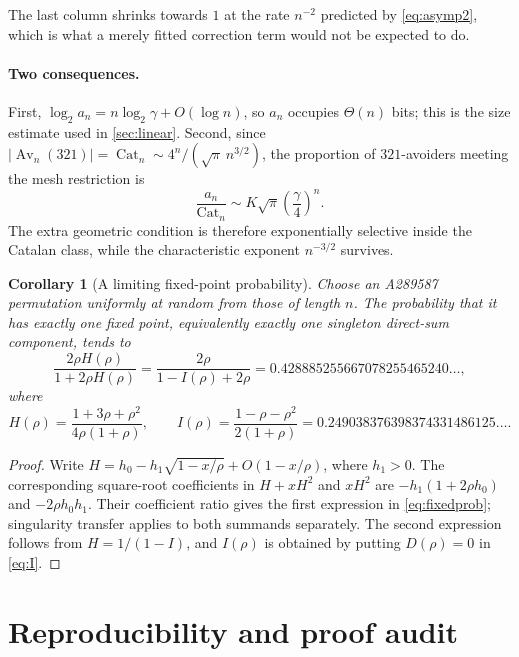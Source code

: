 \documentclass[11pt,letterpaper]{article}
\numberwithin{equation}{section}
\newtheorem{corollary}[theorem]{Corollary}
\theoremstyle{definition}
\DeclareMathOperator{\Av}{Av}
\newcommand{\Cat}{\operatorname{Cat}}
\begin{document}
The last column shrinks towards $1$ at the rate $n^{-2}$ predicted by
\eqref{eq:asymp2}, which is what a merely fitted correction term would
not be expected to do.

\paragraph{Two consequences.}
First, $\log_2a_n=n\log_2\gamma+O(\log n)$, so $a_n$ occupies $\Theta(n)$
bits; this is the size estimate used in \cref{sec:linear}. Second, since
$|\Av_n(321)|=\Cat_n\sim4^n/(\sqrt\pi\,n^{3/2})$, the proportion of
$321$-avoiders meeting the mesh restriction is
\begin{equation}
 \frac{a_n}{\Cat_n}\sim K\sqrt\pi\left(\frac\gamma4\right)^n.
 \label{eq:proportion}
\end{equation}
The extra geometric condition is therefore exponentially selective inside
the Catalan class, while the characteristic exponent $n^{-3/2}$ survives.

\begin{corollary}[A limiting fixed-point probability]
\label{cor:fixedprob}
Choose an A289587 permutation uniformly at random from those of length
$n$. The probability that it has exactly one fixed point, equivalently
exactly one singleton direct-sum component, tends to
\begin{equation}
 \frac{2\rho H(\rho)}{1+2\rho H(\rho)}
    =\frac{2\rho}{1-I(\rho)+2\rho}
    =0.428885255667078255465240\ldots,
 \label{eq:fixedprob}
\end{equation}
where
\begin{equation}
 H(\rho)=\frac{1+3\rho+\rho^2}{4\rho(1+\rho)},
 \qquad
 I(\rho)=\frac{1-\rho-\rho^2}{2(1+\rho)}
        =0.249038376398374331486125\ldots.
 \label{eq:Irho}
\end{equation}
\end{corollary}
\begin{proof}
Write $H=h_0-h_1\sqrt{1-x/\rho}+O(1-x/\rho)$, where $h_1>0$.
The corresponding square-root coefficients in $H+xH^2$ and $xH^2$
are $-h_1(1+2\rho h_0)$ and $-2\rho h_0h_1$. Their coefficient ratio
gives the first expression in \eqref{eq:fixedprob}; singularity transfer
applies to both summands separately. The second expression follows from
$H=1/(1-I)$, and $I(\rho)$ is obtained by putting $D(\rho)=0$ in
\eqref{eq:I}.
\end{proof}

\section{Reproducibility and proof audit}
\label{sec:checks}
\end{document}
